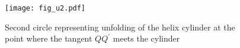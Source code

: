 %

\begin{figure}[!h]
  \centering
  \texttt{[image: fig\_u2.pdf]}
  \caption{Second circle representing unfolding of the helix cylinder at the point where the tangent $QQ^{'}$ meets the cylinder}
  \label{fig:unf2}
\end{figure}

%

